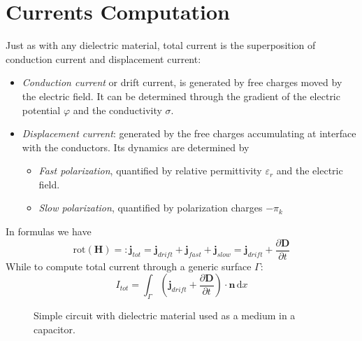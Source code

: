 \documentclass[11pt,a4paper]{article}
\begin{document}
\section{Currents Computation}
Just as with any dielectric material, total current is the superposition of conduction current and displacement current:
\begin{itemize}
	\item \textit{Conduction current} or drift current, is generated by free charges moved by the electric field. It can be determined through the gradient of the electric potential \(\varphi\) and the conductivity \(\sigma\).
	\item \textit{Displacement current}: generated by the free charges accumulating at interface with the conductors. Its dynamics are determined by
	\begin{itemize}
		\item \textit{Fast polarization}, quantified by relative permittivity \(\varepsilon_{r}\) and the electric field.
		\item \textit{Slow polarization}, quantified by polarization charges \(-\pi_k\)
	\end{itemize}
\end{itemize}
In formulas we have
\begin{equation}
	\mathrm{rot}(\mathbf{H})=:\mathbf{j}_{tot} = \mathbf{j}_{drift} + \mathbf{j}_{fast} + \mathbf{j}_{slow} = \mathbf{j}_{drift} + \dfrac{\partial \mathbf{D}}{\partial t}
\end{equation}
While to compute total current through a generic surface \(\Gamma\):
\begin{equation}
	I_{tot} = \int_{\Gamma} \left(\mathbf{j}_{drift}+\dfrac{\partial \mathbf{D}}{\partial t}\right) \cdot \mathbf{n}\,\mathrm{d}x
\end{equation}
\begin{figure}
	\centering
	\caption{Simple circuit with dielectric material used as a medium in a capacitor.}
	\label{fig:circuit}
\end{figure}
\end{document}
